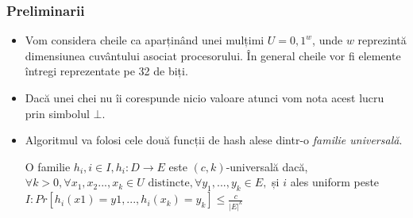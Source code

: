 \documentclass{beamer}
\begin{document}
\begin{frame}
\frametitle{Preliminarii}
\begin{itemize}
\item Vom considera cheile ca aparținând unei mulțimi $U = {0,1}^w$, unde $w$ reprezintă dimensiunea cuvântului asociat procesorului. În general cheile vor fi elemente întregi reprezentate pe 32 de biți.
\item Dacă unei chei nu îi corespunde nicio valoare atunci vom nota acest lucru prin simbolul $\bot$.
\item Algoritmul va folosi cele două funcții de hash alese dintr-o \textit{familie universală}.
\begin{definition}
O familie  $h_i, i \in I, h_i:D \to E$  este $(c,k)$-universală dacă, $\forall k > 0, \forall x_1, x_2 ..., x_k \in U \text{ distincte}, \forall y_1, ..., y_k \in E,$ și $i$ ales uniform peste $I: Pr[h_i(x1) = y1, ..., h_i(x_k) = y_k] \leq \frac{c}{|E|^k}$
\end{definition}
\end{itemize}

\end{frame}
\end{document}
